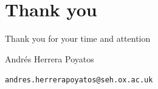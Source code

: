 \documentclass[11pt,a4paper, compress]{beamer}
\makeatletter
\newcommand{\docauthor}{Andr\'es Herrera Poyatos}
\newcommand{\docemail}{andres.herrerapoyatos@seh.ox.ac.uk}
\makeatother
\begin{document}






\section*{Thank you}

{ 
	\begin{frame}[plain]
		\color{white}
		\begin{minipage}[c][\paperheight]{\textwidth}
			\vspace{2em}
			\begin{minipage}{0.85\textwidth}
				Thank you for your time and attention
			\end{minipage}
			\vspace{2em}
			
			\begin{minipage}{0.8\textwidth}	
				 \docauthor
				
				\vspace{1em}
				\texttt{\docemail}
			\end{minipage}
			\vfill
			\vspace{1em}
		\end{minipage}
	\end{frame}
}
\end{document}
